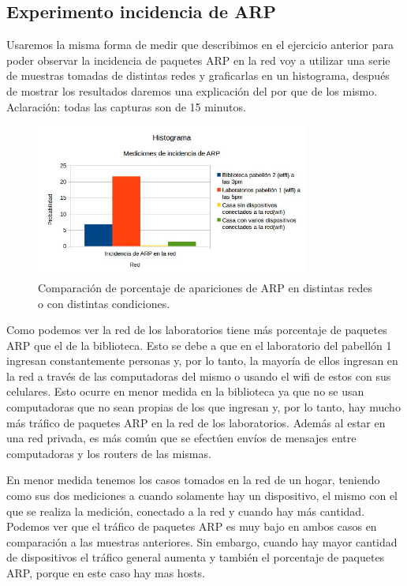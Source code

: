 \subsection{Experimento incidencia de ARP}

Usaremos la misma forma de medir que describimos en el ejercicio anterior para poder observar la incidencia de paquetes ARP en la red voy a utilizar una serie de muestras 
tomadas de distintas redes y graficarlas en un histograma, después de mostrar los resultados daremos una explicación del por que de los mismo. Aclaración: todas las capturas
son de 15 minutos.

\begin{figure}[ht!]
\centering
\includegraphics[width=90mm]{imagenes/IncidenciaARP.jpg}
\caption{Comparación de porcentaje de apariciones de ARP en distintas redes o con distintas condiciones.\label{overflow}}
\end{figure}

Como podemos ver la red de los laboratorios tiene más porcentaje de paquetes ARP que el de la biblioteca. Esto se debe a que en el laboratorio del pabellón 1 ingresan 
constantemente personas y, por lo tanto, la mayoría de ellos ingresan en la red a través de las computadoras del mismo o usando el wifi de estos con sus celulares. Esto 
ocurre en menor medida en la biblioteca ya que no se usan computadoras que no sean propias de los que ingresan y, por lo tanto, hay mucho más tráfico de paquetes ARP en la red 
de los laboratorios. Además al estar en una red privada, es más común que se efectúen envíos de mensajes entre computadoras y los routers de las mismas.

En menor medida tenemos los casos tomados en la red de un hogar, teniendo como sus dos mediciones a cuando solamente hay un dispositivo, el mismo con el que se realiza la medición, 
conectado a la red y cuando hay más cantidad. Podemos ver que el tráfico de paquetes ARP es muy bajo en ambos casos en comparación a las muestras anteriores. Sin embargo, 
cuando hay mayor cantidad de dispositivos el tráfico general aumenta y también el porcentaje de paquetes ARP, porque en este caso hay mas hosts.

